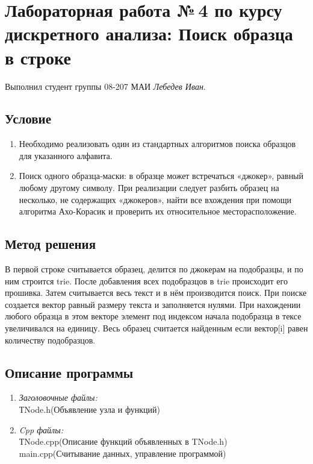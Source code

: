 \documentclass[12pt]{article}
\begin{document}
\section*{Лабораторная работа №\,4 по курсу дискретного анализа: Поиск образца в строке}

Выполнил студент группы 08-207 МАИ \textit{Лебедев Иван}.

\subsection*{Условие}

\begin{enumerate}
\item Необходимо реализовать один из стандартных алгоритмов поиска образцов для указанного алфавита.
\item Поиск одного образца-маски: в образце может встречаться «джокер», равный любому другому символу. При реализации следует разбить образец на несколько, не содержащих «джокеров», найти все вхождения при помощи алгоритма Ахо-Корасик и проверить их относительное месторасположение.
\end{enumerate}

\subsection*{Метод решения}
\par В первой строке считывается образец, делится по джокерам на подобразцы, и по ним строится trie. После добавления всех подобразцов в trie происходит его прошивка. Затем считывается весь текст и в нём производится поиск. При поиске создается вектор равный размеру текста и заполняется нулями. При нахождении любого образца в этом векторе элемент под индексом начала подобразца в тексе увеличивался на единицу. Весь образец считается найденным если вектор[i] равен количеству подобразцов.

\subsection*{Описание программы}

\begin{enumerate}
\item\textsl{Заголовочные файлы:}\\  ТNode.h(Объявление узла и функций)
\item\textsl{Cpp файлы:}\\ ТNode.cpp(Описание функций объявленных в TNode.h) \\ main.cpp(Считывание данных, управление программой)
\end{enumerate}
\end{document}
